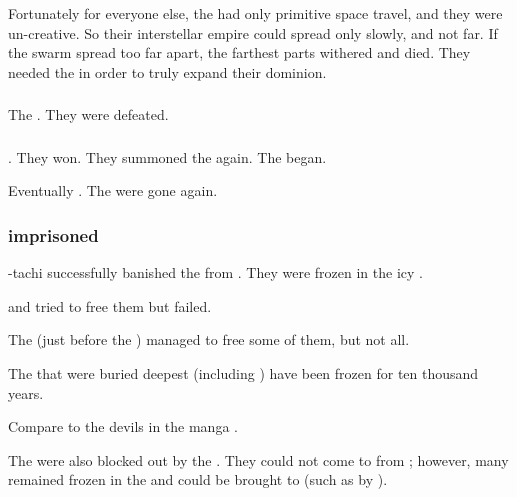Fortunately for everyone else, the \banes had only primitive space travel, and they were un-creative.
So their interstellar empire could spread only slowly, and not far.
If the \bane swarm spread too far apart, the farthest parts withered and died.
They needed the \noggyal {} in order to truly expand their dominion. 





\subsubsection{\Firstbanewar}
The \banes{} . 
They were defeated. 





\subsubsection{\Secondbanewar}
. 
They won.
They summoned the \banes{} again. 
The  began. 

Eventually . 
The \banelords{} were gone again. 





\subsubsection{\Banelords{} imprisoned}
\index{\CrystalSphere}%
\Tiamat-tachi successfully banished the \banelords{} from \Miith{}. 
They were frozen in the icy . 

\Semiza{} and \Thanatzil{} tried to free them but failed. 

The \resphain{} (just before the \Secondbanewar) managed to free some of them, but not all. 

The \banelords{} that were buried deepest (including \Daggerrain) have been frozen for ten thousand years. 

Compare to the devils in the manga \cite{NagaiGo:Devilman}. 

The \lesserbanes{} were also blocked out by the \CrystalSphere. 
They could not come to \Miith{} from \Erebos; however, many \lesserbanes{} remained frozen in the \CrystalSphere{} and could be brought to \Miith{} (such as by ). 






